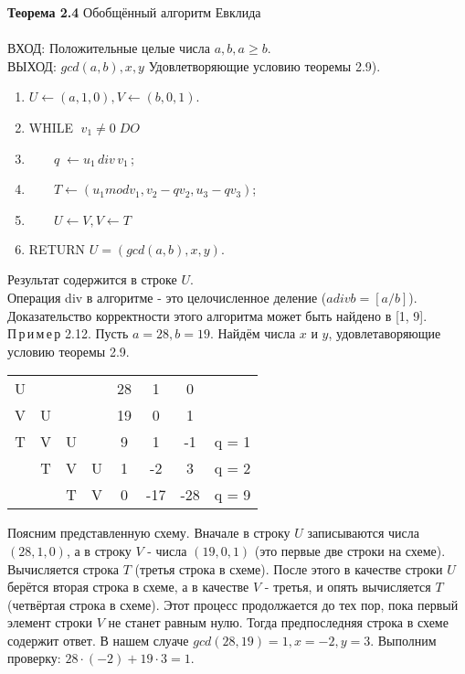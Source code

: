 \documentclass{article}
\begin{document}
 
\textbf{Теорема 2.4} \;\; \large Обобщённый алгоритм Евклида
\\\\
\normalsize  ВХОД: \;\;\; Положительные целые числа $a,b, a \geq b$.
\\
ВЫХОД: \;\;  $gcd(a, b), x, y$  Удовлетворяющие условию теоремы 2.9).
\begin{enumerate}
\item $U \leftarrow (a,1,0), V \leftarrow (b,0,1)$.
\item WHILE $\; v_1\ne0\; DO$
\item $\;\;\;\;\;\;\; q\; \leftarrow u_1\,div\,v_1\,$;
\item $\;\;\;\;\;\;\; T \leftarrow (u_1 mod v_1 , v_2 - qv_2, u_3 - qv_3)$;
\item $\;\;\;\;\;\;\; U \leftarrow V,  V \leftarrow T $
\item RETURN $U = (gcd(a, b), x, y)$.
\end{enumerate}
Результат содержится в строке $U$.
\\
Операция div в алгоритме - это целочисленное деление ($a div b = [a/b]$).  Доказательство корректности этого алгоритма может быть найдено в [1, 9].
\\
П\,р\,и\,м\,е\,р 2.12. \;\; Пусть $a = 28, b =19$. Найдём числа $x$ и $y$, удовлетаворяющие условию теоремы 2.9.
\begin{center}
  \begin{tabular}{c c c c c c c c}
  U &   &   &   & 28 & 1 & 0 & 
  \\
  V & U &   &   & 19 & 0 & 1 & 
  \\
  T & V & U &   & 9 & 1  & -1& q = 1
  \\
     & T & V & U & 1 & -2 & 3 & q = 2
  \\
     &   & T & V & 0 & -17&-28& q = 9
  \\
  \end{tabular} 
\end{center}
Поясним представленную схему. Вначале в строку $U$ записываются числа $(28, 1, 0)$, а в строку $V$ - числа $(19, 0, 1)$ (это первые две строки на схеме). Вычисляется строка $T$ (третья строка в схеме). После этого в качестве строки $U$ берётся вторая строка в схеме, а в качестве $V$  - третья,  и опять вычисляется $T$ (четвёртая строка в схеме). Этот процесс продолжается до тех пор, пока первый элемент строки $V$ не станет равным нулю. Тогда предпоследняя строка в схеме содержит ответ. В нашем слуаче $gcd(28, 19) = 1, x = -2, y = 3$. Выполним проверку: $28\cdot(-2) + 19\cdot3 = 1$.
\end{document}
